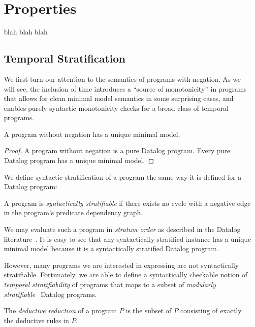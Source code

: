 \section{Properties}

blah blah blah

\subsection{Temporal Stratification}

We first turn our attention to the semantics of
programs with negation.  As we will see, the inclusion of time introduces a
``source of monotonicity'' in programs that allows for clean minimal model
semantics in some surprising cases, and enables purely syntactic monotonicity
checks for a broad class of temporal programs.

\begin{lemma} \label{lemma:no-neg-unique}
%
A \slang program without negation 
has a unique minimal model.
%
\end{lemma}

\begin{proof} 
%
A \slang program without negation 
is a pure Datalog
program.  Every pure Datalog program has a unique minimal model. 
%
\end{proof}

We define syntactic stratification of a \slang program the same way it is
defined for a Datalog program:

\begin{definition}
%
A \slang program is \emph{syntactically stratifiable} if there
exists no cycle with a negative edge 
in the program's
predicate dependency graph.
%
\end{definition}

We may evaluate such a program in {\em stratum order} as described in the
Datalog literature~\cite{ullmanbook}.
It is easy to see that any syntactically stratified \slang instance has a
unique minimal model because it is a syntactically stratified Datalog program.

However, many programs we are interested in expressing are not syntactically
stratifiable.  Fortunately, we are able to define a syntactically checkable
notion of {\em temporal stratifiability} of \slang programs that maps to a
subset of {\em modularly stratifiable}~\cite{modular} Datalog programs.

\begin{definition} 
%
The \emph{deductive reduction} of a \slang program $P$ is
the subset of $P$ consisting of exactly the deductive rules in $P$.
%
\end{definition}

